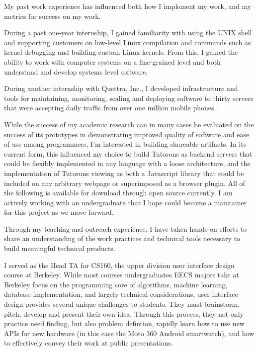 \documentclass[12pt]{memoir}
\begin{document}
My past work experience has influenced both how I implement my work, and my metrics for success on my work.

During a past one-year internship, I gained familiarity with using the UNIX shell and supporting customers on low-level Linux compilation and commands such as kernel debugging and building custom Linux kernels.
From this, I gained the ability to work with computer systems on a fine-grained level and both understand and develop systems level software.

During another internship with Quettra, Inc., I developed infrastructure and tools for maintaining, monitoring, scaling and deploying software to thirty servers that were accepting daily traffic from over one million mobile phones.

While the success of my academic research can in many cases be evaluated on the success of its prototypes in demonstrating improved quality of software and ease of use among programmers, I'm interested in building shareable artifacts.
In its current form, this influenced my choice to build Tutorons as backend servers that could be flexibly implemented in any language with a loose architecture, and the implementation of Tutorons viewing as both a Javascript library that could be included on any arbitrary webpage or superimposed as a browser plugin.
All of the following is available for download through open source currently.
I am actively working with an undergraduate that I hope could become a maintainer for this project as we move forward.

Through my teaching and outreach experience, I have taken hands-on efforts to share an understanding of the work practices and technical tools necessary to build meaningful technical products.

I served as the Head TA for CS160, the upper division user interface design course at Berkeley.
While most courses undergraduates EECS majors take at Berkeley focus on the programming core of algorithms, machine learning, database implementation, and largely technical considerations, user interface design provides several unique challenges to students.
They must brainstorm, pitch, develop and present their own idea.
Through this process, they not only practice need finding, but also problem defintion, rapidly learn how to use new APIs for new hardware (in this case the Moto 360 Android smartwatch), and how to effectively convey their work at public presentations.
\end{document}
